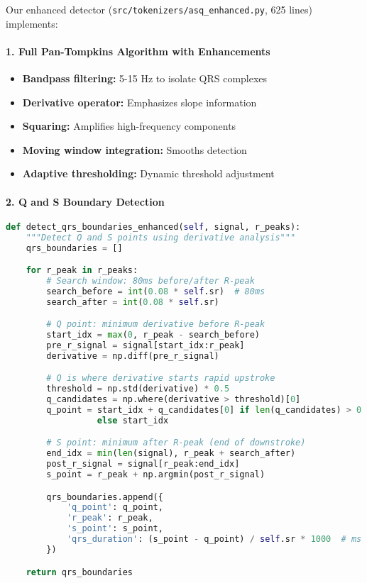 \documentclass[11pt]{article}
\begin{document}
Our enhanced detector (\texttt{src/tokenizers/asq\_enhanced.py}, 625 lines) implements:

\paragraph{1. Full Pan-Tompkins Algorithm with Enhancements}
\begin{itemize}
    \item \textbf{Bandpass filtering:} 5-15 Hz to isolate QRS complexes
    \item \textbf{Derivative operator:} Emphasizes slope information
    \item \textbf{Squaring:} Amplifies high-frequency components
    \item \textbf{Moving window integration:} Smooths detection
    \item \textbf{Adaptive thresholding:} Dynamic threshold adjustment
\end{itemize}

\paragraph{2. Q and S Boundary Detection}
\begin{lstlisting}[language=Python, caption=Q/S Point Detection Algorithm]
def detect_qrs_boundaries_enhanced(self, signal, r_peaks):
    """Detect Q and S points using derivative analysis"""
    qrs_boundaries = []

    for r_peak in r_peaks:
        # Search window: 80ms before/after R-peak
        search_before = int(0.08 * self.sr)  # 80ms
        search_after = int(0.08 * self.sr)

        # Q point: minimum derivative before R-peak
        start_idx = max(0, r_peak - search_before)
        pre_r_signal = signal[start_idx:r_peak]
        derivative = np.diff(pre_r_signal)

        # Q is where derivative starts rapid upstroke
        threshold = np.std(derivative) * 0.5
        q_candidates = np.where(derivative > threshold)[0]
        q_point = start_idx + q_candidates[0] if len(q_candidates) > 0
                  else start_idx

        # S point: minimum after R-peak (end of downstroke)
        end_idx = min(len(signal), r_peak + search_after)
        post_r_signal = signal[r_peak:end_idx]
        s_point = r_peak + np.argmin(post_r_signal)

        qrs_boundaries.append({
            'q_point': q_point,
            'r_peak': r_peak,
            's_point': s_point,
            'qrs_duration': (s_point - q_point) / self.sr * 1000  # ms
        })

    return qrs_boundaries
\end{lstlisting}
\end{document}
